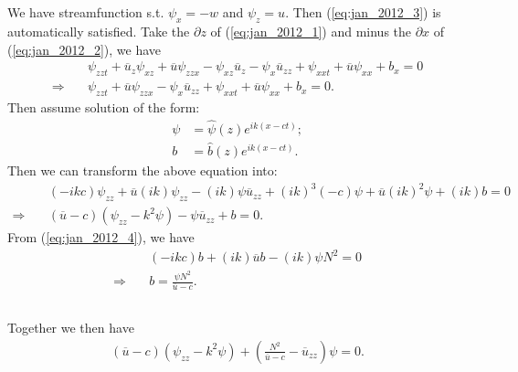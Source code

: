 \documentclass[11pt,letterpaper]{book}
\theoremstyle{definition}
\newcommand{\pe}{\partial}
\newcommand{\thus}{\Rightarrow \quad }
\begin{document}
\subsection{}
We have streamfunction s.t. $\psi_x = -w$ and $\psi_z = u$. Then (\ref{eq:jan_2012_3}) is automatically satisfied. Take the $\pe z$ of (\ref{eq:jan_2012_1}) and minus the $\pe x$ of (\ref{eq:jan_2012_2}), we have
\begin{align*}
&\psi_{zzt}+\overline{u}_z\psi_{xz}+\overline{u}\psi_{zzx}-\psi_{xz}\overline{u}_z-\psi_x\overline{u}_{zz}+\psi_{xxt}+\overline{u}\psi_{xx} + b_x = 0\\
\thus &\psi_{zzt}+\overline{u}\psi_{zzx}-\psi_x\overline{u}_{zz}+\psi_{xxt}+\overline{u}\psi_{xx} + b_x = 0.
\end{align*}
Then assume solution of the form:
\begin{align*}
\psi &= \hat{\psi}(z)e^{ik(x-ct)};\\
b &= \hat{b}(z)e^{ik(x-ct)}.
\end{align*}
Then we can transform the above equation into:
\begin{align*}
&(-ikc)\psi_{zz}+\overline{u}(ik)\psi_{zz}-(ik)\psi\overline{u}_{zz}+(ik)^3(-c)\psi+\overline{u}(ik)^2\psi + (ik)b = 0\\
\thus &(\overline{u}-c)(\psi_{zz}-k^2\psi)-\psi\overline{u}_{zz}+ b = 0.
\end{align*}
From (\ref{eq:jan_2012_4}), we have
\begin{align*}
&(-ikc)b+(ik)\overline{u}b-(ik)\psi N^2 = 0\\
\thus &b = \frac{\psi N^2}{\overline{u}-c}.
\end{align*}

\subsection{}
Together we then have
\begin{align*}
(\overline{u}-c)(\psi_{zz}-k^2\psi)+\left(\frac{ N^2}{\overline{u}-c}-\overline{u}_{zz}\right)\psi = 0.
\end{align*}
\end{document}
